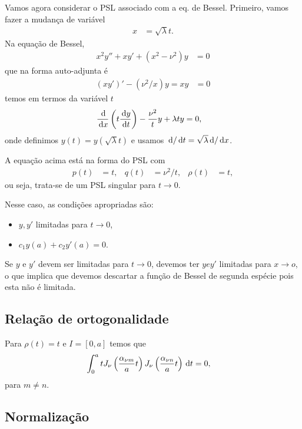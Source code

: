 Vamos agora considerar o PSL associado com a eq. de Bessel. Primeiro, vamos fazer a mudança de variável
\begin{align*}
    x &= \sqrt{\lambda} t.
\end{align*}
Na equação de Bessel,
\begin{align*}
    x^2 y'' + x y' + \left( x^2 - \nu^2 \right) y &= 0
\end{align*}
que na forma auto-adjunta é
\begin{align*}
    \left( x y' \right)' - \left( \nu^2 / x \right) y = x y &= 0
\end{align*}
temos em termos da variável $t$
\begin{align*}
    \frac{\, \mathrm{d}}{\, \mathrm{d}x}\left( t \frac{\, \mathrm{d}y}{\, \mathrm{d}t} \right) - \frac{\nu^2}{t} y + \lambda t y &= 0,
\end{align*}
onde definimos $y(t) = y(\sqrt{\lambda} t)$ e usamos $\, \mathrm{d} / \, \mathrm{d}t = \sqrt{\lambda} \, \mathrm{d} / \, \mathrm{d}x$.

A equação acima está na forma do PSL com
\begin{align*}
    p(t) &= t, & q(t) &= \nu^2 / t, & \rho(t) &= t,
\end{align*}
ou seja, trata-se de um PSL singular para $t \to 0$.

Nesse caso, as condições apropriadas são:
\begin{itemize}
    \item $y, y'$ limitadas para $t \to 0$,
    \item $c_1 y(a) + c_2 y'(a) = 0$.
\end{itemize}

\begin{obs}
    Se $y$ e $y'$ devem ser limitadas para $t \to 0$, devemos ter $y e y'$ limitadas para $x \to o$, o que implica que devemos descartar a função de Bessel de segunda espécie pois esta não é limitada.
\end{obs}


\subsection{Relação de ortogonalidade}
Para $\rho(t) = t$ e $I = [0,a]$ temos que
\begin{align*}
    \int_0^a t J_\nu\left( \frac{\alpha_{\nu m}}{a} t \right) J_\nu\left( \frac{\alpha_{\nu n}}{a} t \right) \, \mathrm{d}t &= 0,
\end{align*}
para $m \neq n$.

\subsection{Normalização}
